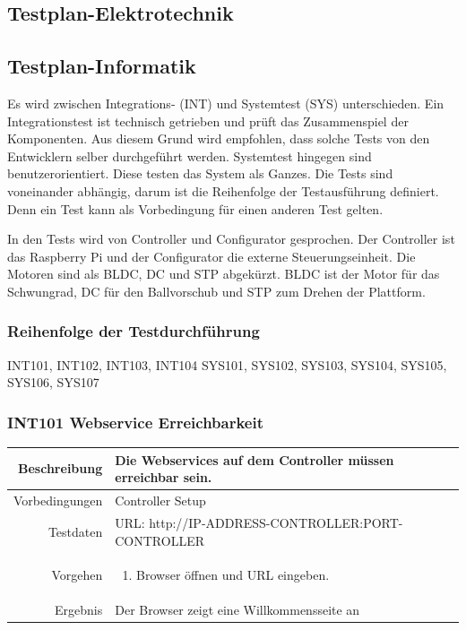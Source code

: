 \subsection{Testplan-Elektrotechnik}

\subsection{Testplan-Informatik}

Es wird zwischen Integrations- (INT) und Systemtest (SYS) unterschieden. Ein Integrationstest
ist technisch getrieben und prüft das Zusammenspiel der Komponenten. Aus diesem
Grund wird empfohlen, dass solche Tests von den Entwicklern selber durchgeführt werden.
Systemtest hingegen sind benutzerorientiert. Diese testen das System als Ganzes.
Die Tests sind voneinander abhängig, darum ist die Reihenfolge der Testausführung
definiert. Denn ein Test kann als Vorbedingung für einen anderen Test gelten. 

In den Tests wird von Controller und Configurator gesprochen. Der Controller ist
das Raspberry Pi und der Configurator die externe Steuerungseinheit.
Die Motoren sind als BLDC, DC und STP abgekürzt.
BLDC ist der Motor für das Schwungrad, DC für den Ballvorschub und STP zum Drehen der Plattform.

\subsubsection{Reihenfolge der Testdurchführung}
INT101, INT102, INT103, INT104
SYS101, SYS102, SYS103, SYS104, SYS105, SYS106, SYS107




\subsubsection{INT101 Webservice Erreichbarkeit}
\begin{table}[h!]
	\renewcommand{\arraystretch}{1.5}
	\begin{tabular}{|r|p{14cm}|}
		\hline Beschreibung & Die Webservices auf dem Controller müssen erreichbar sein. \\ 
		\hline Vorbedingungen & Controller Setup \\ 
		\hline Testdaten & URL: http://IP-ADDRESS-CONTROLLER:PORT-CONTROLLER \\ 
		\hline Vorgehen & 
		\begin{enumerate}
			\item Browser öffnen und URL eingeben.
		\end{enumerate} \\ 
		\hline Ergebnis & Der Browser zeigt eine Willkommensseite an \\ 
		\hline 
	\end{tabular}
\end{table}

